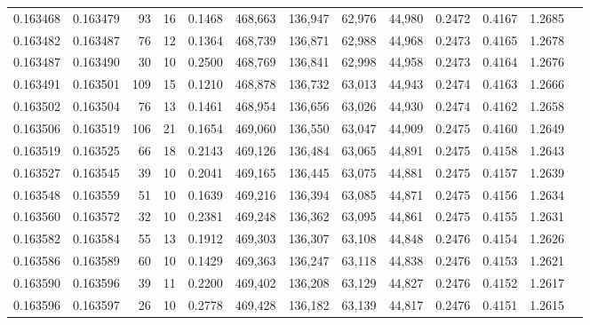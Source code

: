 \begin{tabular}{rrrrrrrrrrrrr}
0.163468 & 0.163479 &    93 &  16 &                                     0.1468 & 468,663 & 136,947 &  62,976 &  44,980 & 0.2472 & 0.4167 & 1.2685 \\
0.163482 & 0.163487 &    76 &  12 &                                     0.1364 & 468,739 & 136,871 &  62,988 &  44,968 & 0.2473 & 0.4165 & 1.2678 \\
0.163487 & 0.163490 &    30 &  10 &                                     0.2500 & 468,769 & 136,841 &  62,998 &  44,958 & 0.2473 & 0.4164 & 1.2676 \\
0.163491 & 0.163501 &   109 &  15 &                                     0.1210 & 468,878 & 136,732 &  63,013 &  44,943 & 0.2474 & 0.4163 & 1.2666 \\
0.163502 & 0.163504 &    76 &  13 &                                     0.1461 & 468,954 & 136,656 &  63,026 &  44,930 & 0.2474 & 0.4162 & 1.2658 \\
0.163506 & 0.163519 &   106 &  21 &                                     0.1654 & 469,060 & 136,550 &  63,047 &  44,909 & 0.2475 & 0.4160 & 1.2649 \\
0.163519 & 0.163525 &    66 &  18 &                                     0.2143 & 469,126 & 136,484 &  63,065 &  44,891 & 0.2475 & 0.4158 & 1.2643 \\
0.163527 & 0.163545 &    39 &  10 &                                     0.2041 & 469,165 & 136,445 &  63,075 &  44,881 & 0.2475 & 0.4157 & 1.2639 \\
0.163548 & 0.163559 &    51 &  10 &                                     0.1639 & 469,216 & 136,394 &  63,085 &  44,871 & 0.2475 & 0.4156 & 1.2634 \\
0.163560 & 0.163572 &    32 &  10 &                                     0.2381 & 469,248 & 136,362 &  63,095 &  44,861 & 0.2475 & 0.4155 & 1.2631 \\
0.163582 & 0.163584 &    55 &  13 &                                     0.1912 & 469,303 & 136,307 &  63,108 &  44,848 & 0.2476 & 0.4154 & 1.2626 \\
0.163586 & 0.163589 &    60 &  10 &                                     0.1429 & 469,363 & 136,247 &  63,118 &  44,838 & 0.2476 & 0.4153 & 1.2621 \\
0.163590 & 0.163596 &    39 &  11 &                                     0.2200 & 469,402 & 136,208 &  63,129 &  44,827 & 0.2476 & 0.4152 & 1.2617 \\
0.163596 & 0.163597 &    26 &  10 &                                     0.2778 & 469,428 & 136,182 &  63,139 &  44,817 & 0.2476 & 0.4151 & 1.2615 \\

\end{tabular}
